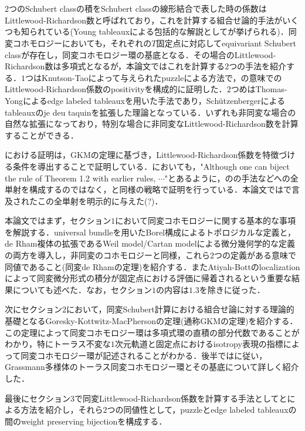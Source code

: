 \section*{}

$2$つのSchubert classの積をSchubert classの線形結合で表した時の係数はLittlewood-Richardson数と呼ばれており，これを計算する組合せ論的手法がいくつも知られている(Young tableauxによる包括的な解説として\cite{fulton young tableaux}が挙げられる)．同変コホモロジーにおいても，それぞれの$T$固定点に対応してequivariant Schubert classが存在し，同変コホモロジー環の基底となる．その場合のLittlewood-Richardson数は多項式となるが，本論文ではこれを計算する$2$つの手法を紹介する．$1$つはKnutson-Tao\cite{knutson tao}によって与えられたpuzzleによる方法で，\cite{positivity}の意味でのLittlewood-Richardson係数のpositivityを構成的に証明した．$2$つめはThomas-Yong\cite{thomas yong}によるedge labeled tableauxを用いた手法であり，Schützenbergerによるtableauxのje deu taquinを拡張した理論となっている．いずれも非同変な場合の自然な拡張になっており，特別な場合に非同変なLittlewood-Richardson数を計算することができる．

\cite{knutson tao}における証明は，GKMの定理に基づき，Littlewood-Richardson係数を特徴づける条件を導出することで証明している．\cite{thomas yong}においても，"Although one can biject the rule of Theorem 1.2
with earlier rules, $\cdots$"とあるように，\cite{knutson tao}のの手法などへの全単射を構成するのではなく，\cite{knutson tao}と同様の戦略で証明を行っている．本論文では\cite{thomas yong}で言及されたこの全単射を明示的に与えた(?)．

本論文ではまず，セクション$1$において同変コホモロジーに関する基本的な事項を解説する．universal bundleを用いたBorel構成によるトポロジカルな定義と，de Rham複体の拡張であるWeil model/Cartan modelによる微分幾何学的な定義の両方を導入し，非同変のコホモロジーと同様，これら$2$つの定義がある意味で同値であること(同変de Rhamの定理)を紹介する．またAtiyah-Bottのlocalizationによって同変微分形式の積分が固定点における評価に帰着されるという重要な結果についても述べた．なお，セクション$1$の内容は$1.3$を除き\cite{tu equivariant}に従った．

次にセクション$2$において，同変Schubert計算における組合せ論に対する理論的基礎となるGoresky-Kottwitz-MacPhersonの定理(通称GKMの定理)を紹介する．この定理によって同変コホモロジー環は多項式環の直積の部分代数であることがわかり，特にトーラス不変な$1$次元軌道と固定点におけるisotropy表現の指標によって同変コホモロジー環が記述されることがわかる．後半では\cite{knutson tao}に従い，Grassmann多様体のトーラス同変コホモロジー環とその基底について詳しく紹介した．

最後にセクション$3$で同変Littlewood-Richardson係数を計算する手法として\cite{knutson tao}と\cite{thomas yong}による方法を紹介し，それら$2$つの同値性として，puzzleとedge labeled tableauxの間のweight preserving bijectionを構成する．
